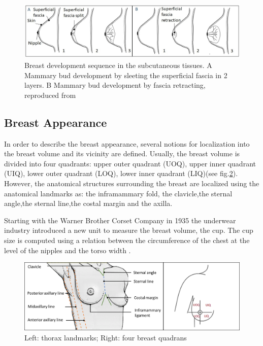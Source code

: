 \begin{figure}[!h]
\centering
\includegraphics[width=0.9\linewidth,keepaspectratio]{figures/breastEvol_fascia_my.jpg} 
\caption[Breast development sequence into subcutaneous tissues. A Mammary bud development by splitting the superficial fascia in 2 layers. B Mammary bud development by superficial fascia retracting]{Breast development sequence in the subcutaneous tissues. A Mammary bud development by sleeting the superficial fascia in 2 layers. B Mammary bud development by fascia retracting, reproduced from  \citep{kopans2007breast}  }
\label{breastevol_fascia}
\end{figure}


\subsection{Breast Appearance}\label{subsection:breastappearance}

In order to describe the breast appearance, several notions for localization into the breast volume and its vicinity are defined. Usually, the breast volume is divided into four quadrants: upper outer quadrant (UOQ), upper inner quadrant (UIQ), lower outer quadrant (LOQ), lower inner quadrant (LIQ)(see fig.\ref{fig:Breast_quadrants_full}). However, the anatomical structures surrounding the breast are localized using the anatomical landmarks as:  the inframammary fold, the clavicle,the sternal angle,the sternal line,the costal margin and the axilla.

Starting with the Warner Brother Corset Company in 1935 the underwear industry introduced a new unit to measure the breast volume, the cup. The cup size is computed using a relation between the circumference of the chest at the level of the nipples and the torso width \citep{pechter_new_1998}.

\begin{figure}[h]
\centering
 \includegraphics[width=\textwidth,keepaspectratio]{figures/Breast_quadrants_full.png}
  \caption{Left: thorax landmarks; Right: four breast quadrans}\label{fig:Breast_quadrants_full}
\end{figure}


